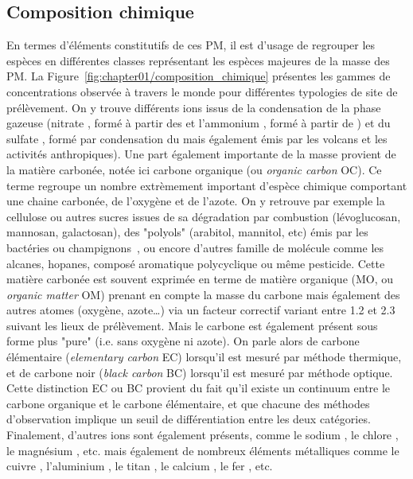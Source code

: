 \subsection{Composition chimique}%
\label{ssub:composition_chimique}

En termes d'éléments constitutifs de ces PM, il est d'usage de regrouper les espèces en
différentes classes représentant les espèces majeures de la masse des PM. La
Figure~\ref{fig:chapter01/composition_chimique} présentes les gammes de concentrations
observée à travers le monde pour différentes typologies de site de prélèvement.
On y trouve différents ions issus de la condensation de la phase gazeuse (nitrate \NOt, formé à
partir des  et l'ammonium , formé à partir de ) et du sulfate
\SOq, formé par condensation du  mais également émis par les volcans et les
activités anthropiques).
Une part également importante de la masse provient de la matière carbonée, notée ici
carbone organique (ou \textit{organic carbon} OC). Ce terme regroupe un nombre extrèmement
important d'espèce chimique comportant une chaine carbonée, de l'oxygène et
de l'azote. On y retrouve par exemple la cellulose ou autres sucres issues de sa
dégradation par combustion (lévoglucosan, mannosan, galactosan), des "polyols" (arabitol,
mannitol, etc) émis par les bactéries ou champignons~\autocite{samakePolyols2019}, ou encore
d'autres famille de molécule comme les alcanes, hopanes, composé aromatique polycyclique
ou même pesticide. Cette matière carbonée est souvent exprimée en terme de matière
organique (MO, ou \textit{organic matter} OM) prenant en compte la masse du carbone mais
également des autres atomes (oxygène, azote…) via un facteur correctif variant entre 1.2
et 2.3 suivant les lieux de prélèvement.
Mais le carbone est également présent sous forme plus "pure" (i.e. sans oxygène ni azote).
On parle alors de carbone élémentaire (\textit{elementary carbon} EC) lorsqu'il est mesuré
par méthode thermique, et de carbone noir (\textit{black carbon} BC) lorsqu'il est mesuré
par méthode optique. Cette distinction EC ou BC provient du fait qu'il existe un continuum
entre le carbone organique et le carbone élémentaire, et que chacune des méthodes
d'observation implique un seuil de différentiation entre les deux catégories.
Finalement, d'autres ions sont également présents, comme le sodium , le chlore
, le magnésium , etc. mais également de nombreux éléments métalliques
comme le cuivre , l'aluminium , le titan , le calcium , le fer
, etc.

